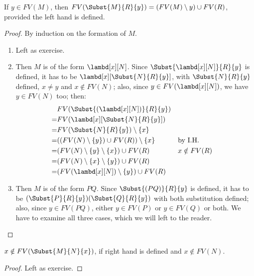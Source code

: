 \documentclass[../../../include/open-logic-section]{subfiles}
\begin{document}
\begin{thm} 
  If $y \in FV(M)$, then $FV(\Subst{M}{R}{y}) = (FV(M) \setminus
  {y}) \cup FV(R)$, provided the left hand is defined.
\end{thm}
\begin{proof}
  By induction on the formation of $M$.
  \begin{enumerate}
  \item[\rule{VAR}] Left as exercise.
  \item[\rule{ABS}] Then $M$ is of the form $\lambd[x][N]$. Since
    $\Subst{\lambd[x][N]}{R}{y}$ is defined, it has to be
    $\lambd[x][\Subst{N}{R}{y}]$, with $\Subst{N}{R}{y}$
    defined, $x \neq y$ and $x \notin FV(N)$; also, since $y \in
    FV(\lambd[x][N])$, we have $y \in FV(N)$ too; then:
    \begin{align*}
      &FV(\Subst{(\lambd[x][N])}{R}{y}) \\
      =&FV(\lambd[x][\Subst{N}{R}{y}]) \\
      =&FV(\Subst{N}{R}{y}) \setminus \{x\} \\
      =&((FV(N) \setminus \{y\}) \cup FV(R)) \setminus \{x\}
       && \text{by I.H.} \\
      =&(FV(N) \setminus \{y\} \setminus \{x\}) \cup FV(R)
       && x \notin FV(R) \\
      =&(FV(N) \setminus \{x\} \setminus \{y\}) \cup FV(R) \\
      =& (FV(\lambd[x][N]) \setminus \{y\}) \cup FV(R)
    \end{align*}
  \item[\rule{APP}] Then $M$ is of the form $PQ$. Since
    $\Subst{(PQ)}{R}{y}$ is defined, it has to be
    $(\Subst{P}{R}{y})(\Subst{Q}{R}{y})$ with both substitution
    defined; also, since $y \in FV(PQ)$, either $y \in FV(P)$ or
    $y \in FV(Q)$ or both. We have to examine all three cases, which
    we will left to the reader.
  \end{enumerate}
\end{proof}

\begin{thm}
  $x \notin FV(\Subst{M}{N}{x})$, if right hand is
  defined and $x \notin FV(N)$.
\end{thm}
\begin{proof}
  Left as exercise.
\end{proof}
\end{document}
